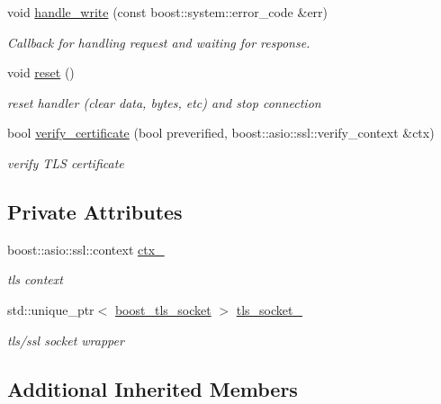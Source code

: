 \begin{DoxyCompactItemize}
void \hyperlink{classrapp_1_1cloud_1_1asio__socket__https_a6d1e9eeb4482b62310b0ca5acb8b23df}{handle\-\_\-write} (const boost\-::system\-::error\-\_\-code \&err)
\begin{DoxyCompactList}\small\item\em Callback for handling request and waiting for response. \end{DoxyCompactList}\item 
void \hyperlink{classrapp_1_1cloud_1_1asio__socket__https_a8d5a8a61eb3717767151a730f5e2939a}{reset} ()
\begin{DoxyCompactList}\small\item\em reset handler (clear data, bytes, etc) and stop connection \end{DoxyCompactList}\item 
bool \hyperlink{classrapp_1_1cloud_1_1asio__socket__https_a229c9f9040f850a2a0d5b38a6523cb7c}{verify\-\_\-certificate} (bool preverified, boost\-::asio\-::ssl\-::verify\-\_\-context \&ctx)
\begin{DoxyCompactList}\small\item\em verify T\-L\-S certificate \end{DoxyCompactList}\end{DoxyCompactItemize}
\subsection*{Private Attributes}
\begin{DoxyCompactItemize}
\item 
boost\-::asio\-::ssl\-::context \hyperlink{classrapp_1_1cloud_1_1asio__socket__https_a802a7a993889dfcfd66286fab4eb30fe}{ctx\-\_\-}
\begin{DoxyCompactList}\small\item\em tls context \end{DoxyCompactList}\item 
std\-::unique\-\_\-ptr$<$ \hyperlink{classrapp_1_1cloud_1_1asio__socket__https_a5c1860ee9dbd4b6b0a2e814c5c094b4e}{boost\-\_\-tls\-\_\-socket} $>$ \hyperlink{classrapp_1_1cloud_1_1asio__socket__https_a35bcea020d1f2efb9c367b9c9ef40153}{tls\-\_\-socket\-\_\-}
\begin{DoxyCompactList}\small\item\em tls/ssl socket wrapper \end{DoxyCompactList}\end{DoxyCompactItemize}
\subsection*{Additional Inherited Members}


